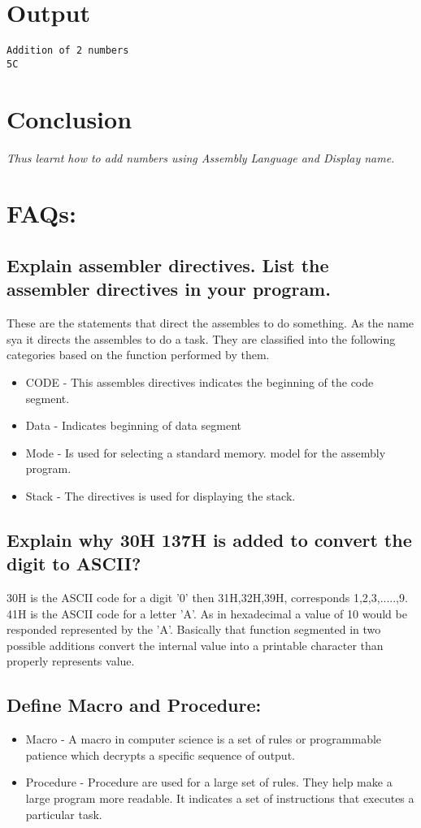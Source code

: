 \documentclass[11pt]{article}
\begin{document}
\section{Output}
\begin{verbatim}
Addition of 2 numbers 
5C
\end{verbatim}
\section{Conclusion}
\textit{Thus learnt how to add numbers using Assembly Language and Display name. }
\pagebreak


\section{\textbf{FAQs:}}
\subsection{\textbf{Explain assembler directives. List the assembler directives in your program.}}
These are the statements that direct the assembles to do something. As the name sya it directs the assembles to do a task.
They are classified into the following categories based on the function performed by them.
\begin{itemize}
    \item CODE - This assembles directives indicates the beginning of the code segment.
    \item Data - Indicates beginning of data segment 
    \item Mode - Is used for selecting a standard memory. model for the assembly program.
    \item Stack - The directives is used for displaying the stack. 
\end{itemize}

\subsection{\textbf{Explain why 30H 137H is added to convert the digit to ASCII?}}
30H is the ASCII code for a digit '0' then 31H,32H,39H, corresponds 1,2,3,.....,9. 41H is the ASCII code for a letter 'A'. As in hexadecimal a value of 10 would be responded represented by the 'A'. Basically that function segmented in two possible additions convert the internal value into a printable character than  properly represents value.

\subsection{\textbf{Define Macro and Procedure:}}
\begin{itemize}
    \item Macro - A macro in computer science is a set of rules or programmable patience which decrypts a specific sequence of output.
    \item Procedure - Procedure are used for a large set of rules. They help make a large program more readable. It indicates a set of instructions that executes a particular task.
\end{itemize}
\end{document}
